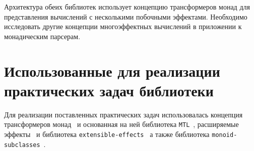   Архитектура обеих библиотек использует концепцию трансформеров монад для
  представления вычислений с несколькими побочными эффектами. Необходимо
  исследовать другие концепции многоэффектных вычислений в приложении к
  монадическим парсерам.

\section{Использованные для реализации практических задач библиотеки}

Для реализации поставленных практических задач использовалась концепция 
трансформеров монад~\cite{monadTransformers} и основанная на ней библиотека
\lstinline{MTL}~\cite{mtlHackage}, расширяемые эффекты~\cite{extEffects} 
и библиотека \lstinline{extensible-effects}~\cite{extensibleEffectsHackage} а также библиотека
\lstinline{monoid-subclasses}~\cite{monoidSubclassesHackage}.